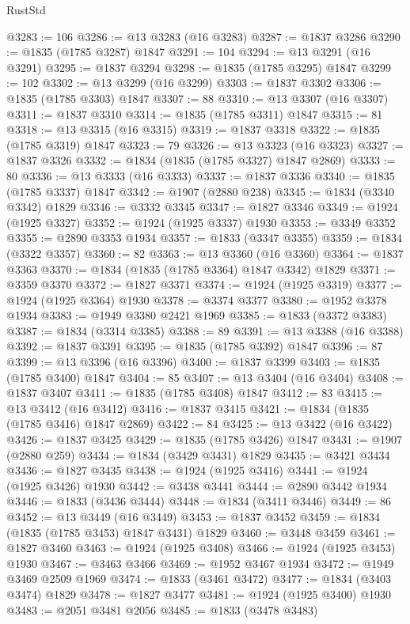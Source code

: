 \begin{lexlean}{RustStd}
\begin{coremodule}
{\begin{coremodule}
{{{{{@3283 := 106
@3286 := @13 @3283 (@16 @3283)
@3287 := @1837 @3286
@3290 := @1835 (@1785 @3287) @1847
@3291 := 104
@3294 := @13 @3291 (@16 @3291)
@3295 := @1837 @3294
@3298 := @1835 (@1785 @3295) @1847
@3299 := 102
@3302 := @13 @3299 (@16 @3299)
@3303 := @1837 @3302
@3306 := @1835 (@1785 @3303) @1847
@3307 := 88
@3310 := @13 @3307 (@16 @3307)
@3311 := @1837 @3310
@3314 := @1835 (@1785 @3311) @1847
@3315 := 81
@3318 := @13 @3315 (@16 @3315)
@3319 := @1837 @3318
@3322 := @1835 (@1785 @3319) @1847
@3323 := 79
@3326 := @13 @3323 (@16 @3323)
@3327 := @1837 @3326
@3332 := @1834 (@1835 (@1785 @3327) @1847 @2869)
@3333 := 80
@3336 := @13 @3333 (@16 @3333)
@3337 := @1837 @3336
@3340 := @1835 (@1785 @3337) @1847
@3342 := @1907 (@2880 @238)
@3345 := @1834 (@3340 @3342) @1829
@3346 := @3332 @3345
@3347 := @1827 @3346
@3349 := @1924 (@1925 @3327)
@3352 := @1924 (@1925 @3337) @1930
@3353 := @3349 @3352
@3355 := @2890 @3353 @1934
@3357 := @1833 (@3347 @3355)
@3359 := @1834 (@3322 @3357)
@3360 := 82
@3363 := @13 @3360 (@16 @3360)
@3364 := @1837 @3363
@3370 := @1834 (@1835 (@1785 @3364) @1847 @3342) @1829
@3371 := @3359 @3370
@3372 := @1827 @3371
@3374 := @1924 (@1925 @3319)
@3377 := @1924 (@1925 @3364) @1930
@3378 := @3374 @3377
@3380 := @1952 @3378 @1934
@3383 := @1949 @3380 @2421 @1969
@3385 := @1833 (@3372 @3383)
@3387 := @1834 (@3314 @3385)
@3388 := 89
@3391 := @13 @3388 (@16 @3388)
@3392 := @1837 @3391
@3395 := @1835 (@1785 @3392) @1847
@3396 := 87
@3399 := @13 @3396 (@16 @3396)
@3400 := @1837 @3399
@3403 := @1835 (@1785 @3400) @1847
@3404 := 85
@3407 := @13 @3404 (@16 @3404)
@3408 := @1837 @3407
@3411 := @1835 (@1785 @3408) @1847
@3412 := 83
@3415 := @13 @3412 (@16 @3412)
@3416 := @1837 @3415
@3421 := @1834 (@1835 (@1785 @3416) @1847 @2869)
@3422 := 84
@3425 := @13 @3422 (@16 @3422)
@3426 := @1837 @3425
@3429 := @1835 (@1785 @3426) @1847
@3431 := @1907 (@2880 @259)
@3434 := @1834 (@3429 @3431) @1829
@3435 := @3421 @3434
@3436 := @1827 @3435
@3438 := @1924 (@1925 @3416)
@3441 := @1924 (@1925 @3426) @1930
@3442 := @3438 @3441
@3444 := @2890 @3442 @1934
@3446 := @1833 (@3436 @3444)
@3448 := @1834 (@3411 @3446)
@3449 := 86
@3452 := @13 @3449 (@16 @3449)
@3453 := @1837 @3452
@3459 := @1834 (@1835 (@1785 @3453) @1847 @3431) @1829
@3460 := @3448 @3459
@3461 := @1827 @3460
@3463 := @1924 (@1925 @3408)
@3466 := @1924 (@1925 @3453) @1930
@3467 := @3463 @3466
@3469 := @1952 @3467 @1934
@3472 := @1949 @3469 @2509 @1969
@3474 := @1833 (@3461 @3472)
@3477 := @1834 (@3403 @3474) @1829
@3478 := @1827 @3477
@3481 := @1924 (@1925 @3400) @1930
@3483 := @2051 @3481 @2056
@3485 := @1833 (@3478 @3483)
}}}}}
\end{coremodule}}
\end{coremodule}
\end{lexlean}
